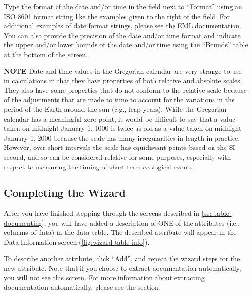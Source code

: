 Type the format of the date and/or time in the field next to ``Format''
using an ISO 8601  format string like the examples given to the right of
the field. For additional examples of date format strings, please see
the \href{http://knb.ecoinformatics.org/software/eml/eml-2.1.0/eml-coverage.html}
{EML documentation}. You can also provide the precision of the date
and/or time format and indicate the upper and/or lower bounds of the
date and/or time using the ``Bounds'' table at the bottom of the screen. 

\begin{shaded}
  \textbf{NOTE} Date and time values in the Gregorian calendar are very
  strange to use in calculations in that they have properties of both
  relative and absolute scales. They also have some properties that do
  not conform to the relative scale because of the adjustments that are
  made to time to account for the variations in the period of the Earth
  around the sun (e.g., leap years). While the Gregorian calendar has a
  meaningful zero point, it would be difficult to say that a value taken
  on midnight January 1, 1000 is twice as old as a value taken on
  midnight January 1, 2000 because the scale has many irregularities in
  length in practice. However, over short intervals the scale has
  equidistant points based on the SI second, and so can be considered
  relative for some purposes, especially with respect to measuring the
  timing of short-term ecological events.
\end{shaded}

\subsection{Completing the Wizard} \label{sec:table-completing}

After you have finished stepping through the screens described in
\autoref{sec:table-documenting}, you will have added a description of
ONE of the attributes (i.e., columns of data) in the data table. The
described attribute will appear in the Data Information screen
(\autoref{fig:wizard-table-info}). 

To describe another attribute, click ``Add'', and repeat the wizard steps
for the new attribute. Note that if you choose to extract documentation
automatically, you will not see this screen. For more information about
extracting documentation automatically, please see the
 section.

